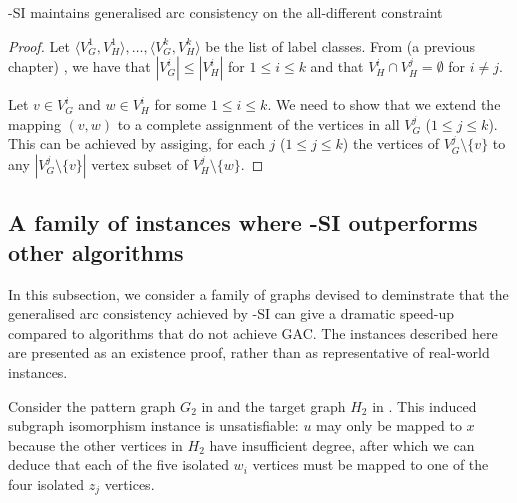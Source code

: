 \begin{proposition}\label{gacProposition}
    \McSplit-SI maintains generalised arc consistency on the all-different constraint
\end{proposition}

\begin{proof}
Let $\langle V_G^1, V_H^1 \rangle, \dots, \langle V_G^k, V_H^k \rangle$ be the list of
label classes.  From (a previous chapter) , we have that $|V_G^i| \leq |V_H^i|$
for $1 \leq i \leq k$ and that $V_H^i \cap V_H^j = \emptyset$ for $i \not= j$.

Let $v \in V_G^i$ and $w \in V_H^i$ for some $1 \leq i \leq k$.  We need to show that we
extend the mapping
$(v,w)$ to a complete assignment of the vertices in all $V_G^j$ ($1 \leq j \leq k$).
This can be achieved by assiging, for each $j$ ($1 \leq j \leq k$) the vertices of
$V_G^j \setminus \{v\}$ to any $|V_G^j \setminus \{v\}|$ vertex subset of
$V_H^j \setminus \{w\}$.
\end{proof}

\subsection{A family of instances where \McSplit-SI outperforms other algorithms}

In this subsection, we consider a family of graphs devised to deminstrate
that the generalised arc consistency achieved by \McSplit-SI can give a dramatic
speed-up compared to algorithms that do not achieve GAC.
The instances described here are presented as an existence proof, rather than
as representative of real-world instances.

Consider the pattern graph $G_2$ in  and the target
graph $H_2$ in .  This induced subgraph isomorphism
instance is unsatisfiable: $u$ may only be mapped to $x$ because the other
vertices in $H_2$ have insufficient degree, after which we can deduce
that each of the five isolated $w_i$ vertices must be mapped to one of the four
isolated $z_j$ vertices.

